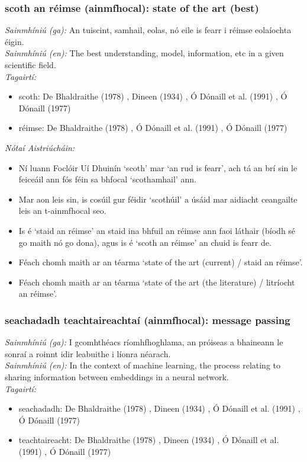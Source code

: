 \subsubsection*{scoth an réimse (ainmfhocal): state of the art (best)}
 \noindent \textit{Sainmhíniú (ga):} An tuiscint, samhail, eolas, nó eile is fearr i réimse eolaíochta éigin.
\\
 \noindent \textit{Sainmhíniú (en):} The best understanding, model, information, etc in a given scientific field.
\\
 \noindent \textit{Tagairtí:}
\begin{itemize}
	\item scoth: De Bhaldraithe (1978) \cite{de-bhaldraithe}, Dineen (1934) \cite{dineen}, Ó Dónaill et al. (1991) \cite{focloir-beag}, Ó Dónaill (1977) \cite{odonaill}
	\item réimse: De Bhaldraithe (1978) \cite{de-bhaldraithe}, Ó Dónaill et al. (1991) \cite{focloir-beag}, Ó Dónaill (1977) \cite{odonaill}
\end{itemize}

 \noindent \textit{Nótaí Aistriúcháin:}
\begin{itemize}
	\item Ní luann Foclóir Uí Dhuinín `scoth' mar `an rud is fearr', ach tá an brí sin le feiceáil ann fós féin sa bhfocal `scothamhail' ann.
	\item Mar aon leis sin, is cosúil gur féidir `scothúil' a úsáid mar aidiacht ceangailte leis an t-ainmfhocal seo.
	\item Is é `staid an réimse' an staid ina bhfuil an réimse ann faoi láthair (bíodh sé go maith nó go dona), agus is é `scoth an réimse' an chuid is fearr de.
	\item Féach chomh maith ar an téarma `state of the art (current) / staid an réimse'.
	\item Féach chomh maith ar an téarma `state of the art (the literature) / litríocht an réimse'.
\end{itemize}


\subsubsection*{seachadadh teachtaireachtaí (ainmfhocal): message passing}
 \noindent \textit{Sainmhíniú (ga):} I gcomhthéacs ríomhfhoghlama, an próiseas a bhaineann le sonraí a roinnt idir leabuithe i líonra néarach.
\\
 \noindent \textit{Sainmhíniú (en):} In the context of machine learning, the process relating to sharing information between embeddings in a neural network.
\\
 \noindent \textit{Tagairtí:}
\begin{itemize}
	\item seachadadh: De Bhaldraithe (1978) \cite{de-bhaldraithe}, Dineen (1934) \cite{dineen}, Ó Dónaill et al. (1991) \cite{focloir-beag}, Ó Dónaill (1977) \cite{odonaill}
	\item teachtaireacht: De Bhaldraithe (1978) \cite{de-bhaldraithe}, Dineen (1934) \cite{dineen}, Ó Dónaill et al. (1991) \cite{focloir-beag}, Ó Dónaill (1977) \cite{odonaill}
\end{itemize}


